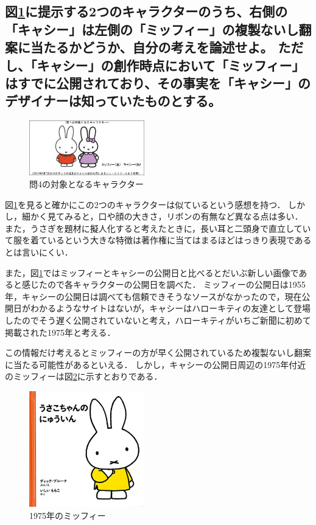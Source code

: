 \documentclass[titlepage,a4paper]{jsarticle}
\begin{document}
\subsection{図\ref{miffy}に提示する2つのキャラクターのうち、右側の「キャシー」は左側の「ミッフィー」の複製ないし翻案に当たるかどうか、自分の考えを論述せよ。
  ただし、「キャシー」の創作時点において「ミッフィー」はすでに公開されており、その事実を「キャシー」のデザイナーは知っていたものとする。}
\begin{figure}[H]
  \centering
  \includegraphics[width=5cm]{img/img_task4.png}
  \caption{問4の対象となるキャラクター}
  \label{miffy}
\end{figure}
図\ref{miffy}を見ると確かにこの2つのキャラクターは似ているという感想を持つ．
しかし，細かく見てみると，口や顔の大きさ，リボンの有無など異なる点は多い．
また，うさぎを題材に擬人化すると考えたときに，長い耳と二頭身で直立していて服を着ているという大きな特徴は著作権に当てはまるほどはっきり表現であるとは言いにくい．

また，図\ref{miffy}ではミッフィーとキャシーの公開日と比べるとだいぶ新しい画像であると感じたので各キャラクターの公開日を調べた．
ミッフィーの公開日は1955年\cite{task5_1}，キャシーの公開日は調べても信頼できそうなソースがなかったので，現在公開日がわかるようなサイトはないが，キャシーはハローキティの友達として登場したのでそう遅く公開されていないと考え，ハローキティがいちご新聞に初めて掲載された1975年と考える\cite{task5_2}．

この情報だけ考えるとミッフィーの方が早く公開されているため複製ないし翻案に当たる可能性があるといえる．
しかし，キャシーの公開日周辺の1975年付近のミッフィーは図\ref{miffy_1975}\cite{miffy_1975_fig}に示すとおりである．

\begin{figure}[h]
  \centering
  \includegraphics[width=5cm]{img/image.png}
  \caption{1975年のミッフィー}
  \label{miffy_1975}
\end{figure}
\end{document}
